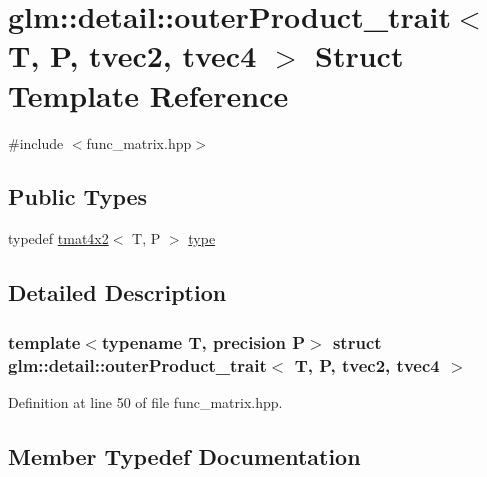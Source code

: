 \hypertarget{structglm_1_1detail_1_1outer_product__trait_3_01_t_00_01_p_00_01tvec2_00_01tvec4_01_4}{}\section{glm\+::detail\+::outer\+Product\+\_\+trait$<$ T, P, tvec2, tvec4 $>$ Struct Template Reference}
\label{structglm_1_1detail_1_1outer_product__trait_3_01_t_00_01_p_00_01tvec2_00_01tvec4_01_4}


{\ttfamily \#include $<$func\+\_\+matrix.\+hpp$>$}

\subsection*{Public Types}
\begin{DoxyCompactItemize}
\item 
typedef \mbox{\hyperlink{structglm_1_1tmat4x2}{tmat4x2}}$<$ T, P $>$ \mbox{\hyperlink{structglm_1_1detail_1_1outer_product__trait_3_01_t_00_01_p_00_01tvec2_00_01tvec4_01_4_a09deeaa6aef1fc2c29aa2e0650ba750b}{type}}
\end{DoxyCompactItemize}


\subsection{Detailed Description}
\subsubsection*{template$<$typename T, precision P$>$\newline
struct glm\+::detail\+::outer\+Product\+\_\+trait$<$ T, P, tvec2, tvec4 $>$}



Definition at line 50 of file func\+\_\+matrix.\+hpp.



\subsection{Member Typedef Documentation}
\mbox{\label{structglm_1_1detail_1_1outer_product__trait_3_01_t_00_01_p_00_01tvec2_00_01tvec4_01_4_a09deeaa6aef1fc2c29aa2e0650ba750b}} 
